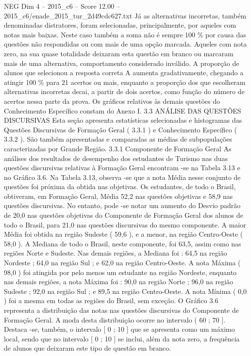 \begin{textsample}{NEG Dim 4 – 2015\_c6 – Score 12.00 – 2015\_c6/enade\_2015\_tur\_2d49cdc627.txt}
Já as alternativas incorretas, também denominadas distratores, foram selecionadas, principalmente, por aqueles com notas mais baixas.
Neste caso também a soma não é sempre 100 \% por causa das questões não respondidas ou com mais de uma opção marcada.
Aqueles com nota zero, na sua quase totalidade deixaram esta questão em branco ou marcaram mais de uma alternativa, comportamento considerado inválido.
A proporção de alunos que selecionou a resposta correta A aumenta gradativamente, chegando a atingir 100 \% para 21 acertos ou mais, enquanto a proporção dos que escolheram alternativas incorretas decai, a partir de dois acertos, como função do número de acertos nessa parte da prova.
Os gráficos relativos às demais questões do Conhecimento Específico constam do Anexo I. 3.3 ANÁLISE DAS QUESTÕES DISCURSIVAS Esta seção apresenta estatísticas selecionadas e histogramas das Questões Discursivas de Formação Geral ( 3.3.1 ) e Conhecimento Específico ( 3.3.2 ).
São também apresentadas e comparadas as médias de subpopulações caracterizadas por Grande Região. 3.3.1 Componente de Formação Geral As análises dos resultados de desempenho dos estudantes de Turismo nas duas questões discursivas relativas à Formação Geral encontram -se na Tabela 3.13 e no Gráfico 3.6.
Na Tabela 3.13, observa -se que a nota Média nesse conjunto de questões foi próxima da obtida nas objetivas.
Os estudantes, de todo o Brasil, obtiveram, em Formação Geral, Média 52,2 nas questões objetivas e 58,9 nas questões discursivas.
No entanto, pode -se notar um aumento do Desvio padrão de 20,0 nas questões objetivas do Componente de Formação Geral dos alunos de todo o Brasil, para 21,0 nas questões discursivas do mesmo componente.
A maior Média foi obtida na região Sudeste ( 59,6 ), e a menor, na região Centro-Oeste ( 58,0 ).
A Mediana de todo o Brasil, neste componente, foi 63,5, assim como nas regiões Norte e Sudeste.
Nas demais regiões, a Mediana foi : 64,5 na região Nordeste ; 64,0 na região Sul ; e 62,0 na região Centro-Oeste.
A nota Máxima ( 98,0 ) foi atingida por pelo menos um estudante na região Nordeste, enquanto nas demais regiões, a nota Máxima foi : 90,0 na região Norte ; 96,0 na região Sudeste ; 92,0 na região Sul ; e 89,5 na região Centro-Oeste.
A nota Mínima ( 0,0 ) foi a mesma em todas as regiões do Brasil, sem exceção.
O Gráfico 3.6 representa a distribuição das notas nas questões discursivas do Componente de Formação Geral.
A moda desta distribuição ocorre no intervalo ( 60 ; 70 ].
Destaca -se, também, o intervalo [ 0 ; 10 ] que se apresenta como um máximo local, sendo que no intervalo [ 0 ; 10 ] se inclui, além da nota zero, a frequência de alunos que deixaram este tipo de questão em branco.

\end{textsample}
